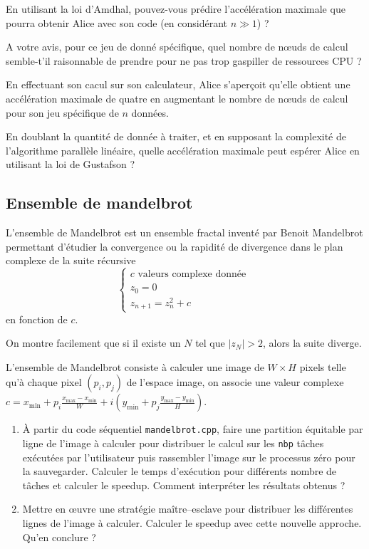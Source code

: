 \documentclass[11pt,a4paper]{article}
\begin{document}
En utilisant la loi d'Amdhal, pouvez-vous prédire l'accélération maximale que pourra obtenir Alice
avec son code (en considérant $n\gg 1$) ? 

A votre avis, pour ce jeu de donné spécifique, quel nombre de n{\oe}uds de calcul semble-t'il
raisonnable de prendre pour ne pas trop gaspiller de ressources CPU ?

En effectuant son cacul sur son calculateur, Alice s'aperçoit qu'elle obtient une accélération
maximale de quatre en augmentant le nombre de n{\oe}uds de calcul pour son jeu spécifique de $n$ données.

En doublant la quantité de donnée à traiter, et en supposant la complexité de l'algorithme parallèle
linéaire, quelle accélération maximale peut espérer Alice en utilisant la loi de Gustafson ?

\subsection{Ensemble de mandelbrot}

L'ensemble de Mandelbrot est un ensemble fractal inventé par Benoit Mandelbrot permettant d'étudier  la convergence ou la rapidité de divergence dans le plan complexe de la suite récursive 
$$
\left\{\begin{array}{l}
c \mbox{ valeurs complexe donnée } \\
z_{0} = 0\\
z_{n+1} = z_{n}^{2} + c
\end{array}\right.
$$
en fonction de $c$.

On montre facilement que si il existe un $N$ tel que $|z_{N}| > 2$, alors la suite diverge. 

L'ensemble de Mandelbrot consiste à calculer une image de $W \times H$ pixels telle qu'à chaque pixel $\left(p_{i},p_{j}\right)$ de l'espace image, on associe une valeur complexe
$c = x_{\min}+p_{i} \frac{x_{\max}-x_{\min}}{W} +  i \left (y_{\min}+p_{j} \frac{y_{\max}-y_{\min}}{H}\right)$.

\begin{enumerate}
\item À partir du code séquentiel \texttt{mandelbrot.cpp}, faire une partition équitable par ligne de l'image à calculer pour distribuer le calcul sur les \texttt{nbp} tâches exécutées par l'utilisateur puis rassembler l'image sur le processus zéro pour la sauvegarder. Calculer le temps d'exécution pour différents nombre de tâches et calculer le speedup. Comment interpréter les résultats obtenus ?
\item Mettre en {\oe}uvre une stratégie maître--esclave pour distribuer les différentes lignes de l'image à calculer. Calculer le speedup avec cette nouvelle approche. Qu'en conclure ?
\end{enumerate}
\end{document}

